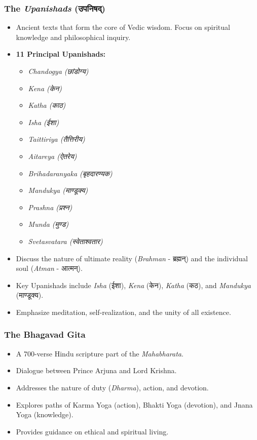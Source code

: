 
\begin{frame}[fragile]\frametitle{The \textit{Upanishads} (उपनिषद्)}

      \begin{itemize}
		\item Ancient texts that form the core of Vedic wisdom. Focus on spiritual knowledge and philosophical inquiry.
        \item \textbf{11 Principal Upanishads:}
        \begin{itemize}
            \item \textit{Chandogya (छांडोग्य)} 
            \item \textit{Kena (केन)}
            \item \textit{Katha (काठ)}
            \item \textit{Isha (ईशा)}
            \item \textit{Taittiriya (तैत्तिरीय)}
            \item \textit{Aitareya (ऐतरेय)}
            \item \textit{Brihadaranyaka (बृहदारण्यक)}
            \item \textit{Mandukya (माण्डूक्य)}
            \item \textit{Prashna (प्रश्न)}
            \item \textit{Munda (मुण्ड)}
            \item \textit{Svetasvatara (स्वेताश्वतार)}
        \end{itemize}		
		\item Discuss the nature of ultimate reality (\textit{Brahman} - ब्रह्मन्) and the individual soul (\textit{Atman} - आत्मन्).
		\item Key Upanishads include \textit{Isha} (ईशा), \textit{Kena} (केन), \textit{Katha} (कठ), and \textit{Mandukya} (माण्डूक्य).
		\item Emphasize meditation, self-realization, and the unity of all existence.
	  \end{itemize}

\end{frame}


\begin{frame}[fragile]\frametitle{The Bhagavad Gita}

      \begin{itemize}
		\item A 700-verse Hindu scripture part of the \textit{Mahabharata}.
		\item Dialogue between Prince Arjuna and Lord Krishna.
		\item Addresses the nature of duty (\textit{Dharma}), action, and devotion.
		\item Explores paths of Karma Yoga (action), Bhakti Yoga (devotion), and Jnana Yoga (knowledge).
		\item Provides guidance on ethical and spiritual living.
	  \end{itemize}

\end{frame}

